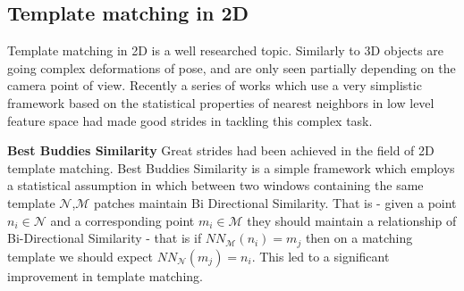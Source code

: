 \documentclass[10pt,twocolumn,letterpaper]{article}
\begin{document}
\subsection{Template matching in 2D}
Template matching in 2D is a well researched topic. Similarly to 3D objects are going complex deformations of pose, and are only seen partially depending on the camera point of view. Recently a series of works which use a very simplistic framework based on the statistical properties of nearest neighbors in low level feature space had made good strides in tackling this complex task.

\textbf{Best Buddies Similarity}
Great strides had been achieved in the field of 2D template matching. Best Buddies Similarity\cite{dekel2015best} is a simple framework which employs a statistical assumption in which between two windows containing the same template $\mathcal{N}$,$\mathcal{M}$ patches maintain Bi Directional Similarity. 
That is - given a point $n_i\in\mathcal{N}$ and a corresponding point $m_i\in\mathcal{M}$ they should maintain a relationship of Bi-Directional Similarity - that is if $NN_{\mathcal{M}}(n_i)=m_j$ then on a matching template we should expect $NN_{\mathcal{N}}(m_j)=n_i$. This led to a significant improvement in template matching.
\end{document}
